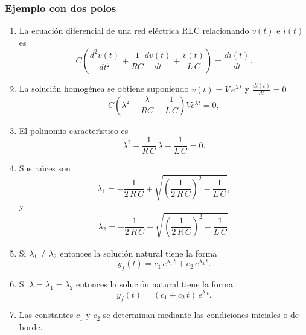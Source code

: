 \documentclass[11pt,a4paper,openany]{book}
\begin{document}
\subsubsection{Ejemplo con dos polos}

\begin{enumerate}
	\item La ecuaci\'{o}n diferencial de una red el\'{e}ctrica RLC relacionando $v\left(t\right) $ e $i\left( t\right) $ es 
	\begin{equation}
		C\left( \frac{d^{2} v\left( t\right) }{dt^{2}}+
		\frac{1}{RC}\frac{dv\left( t\right) }{dt}+
		\frac{v\left( t\right) }{L \, C} \right) =
		\frac{di\left( t\right) }{dt}.
	\end{equation}
	
	\item La soluci\'{o}n homog\'{e}nea se obtiene suponiendo $v(t) = V \, e^{\lambda \, t}$ y $\frac{di\left( t\right) }{dt} = 0$
	\begin{equation}
		C\left( \lambda^{2} + \frac{\lambda}{RC} + \frac{1}{L \, C} \right) V e^{\lambda t} = 0,
	\end{equation}
	
	\item El polinomio caracter\'{\i}stico es 
	\begin{equation}
		\lambda ^{2}+\frac{1}{R \, C} \, \lambda +\frac{1}{L \, C} = 0.
	\end{equation}
	
	\item Sus ra\'{\i}ces son 
	\begin{equation}
		\lambda_{1}=-\frac{1}{2 \, R \, C}+\sqrt{\left( \frac{1}{2 \, R \, C}\right) ^{2}-\frac{1}{L \, C}},
	\end{equation}
	y 
	\begin{equation}
		\lambda_{2}=-\frac{1}{2 \, R \, C}-\sqrt{\left( \frac{1}{2 \, R \, C}\right) ^{2}-\frac{1}{L \, C}}.
	\end{equation}
	
	\item Si $\lambda_{1} \neq \lambda_{2}$ entonces la soluci\'{o}n natural tiene la forma
	\begin{equation}
		y_{f}\left( t\right) = c_{1} \, e^{\lambda_{1} \, t} + c_{2} \, e^{\lambda_{2} \, t}.
	\end{equation}
	
	\item Si $\lambda = \lambda_{1} = \lambda_{2}$ entonces la soluci\'{o}n natural tiene la forma
	\begin{equation}
		y_{f}\left( t\right) = (c_{1} + c_{2} \, t) \, e^{\lambda \, t}.
	\end{equation}
	
	\item Las constantes $c_{1}$ y $c_{2}$ se determinan mediante las condiciones iniciales o de borde.
\end{enumerate}
\end{document}

